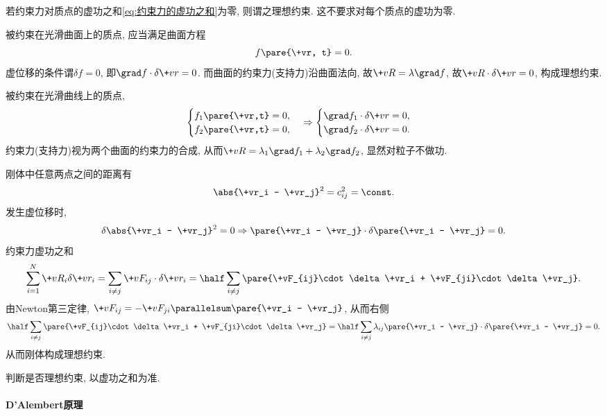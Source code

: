 \documentclass[../LectureNotes.tex]{subfiles}
\begin{document}
若约束力对质点的虚功之和\eqref{eq:约束力的虚功之和}为零, 则谓之理想约束. 这不要求对每个质点的虚功为零.
\begin{sample}
    \begin{ex}
        被约束在光滑曲面上的质点, 应当满足曲面方程
        \[ f\pare{\+vr, t} = 0. \]
        虚位移的条件谓$\delta f = 0$, 即$\grad f \cdot\delta\+vr = 0$. 而曲面的约束力(支持力)沿曲面法向, 故$\+vR = \lambda\grad f$, 故$\+vR\cdot\delta\+vr = 0$, 构成理想约束.
    \end{ex}
    \begin{ex}
        被约束在光滑曲线上的质点,
        \[ \begin{cases}
            f_1\pare{\+vr,t} = 0,\\
            f_2\pare{\+vr,t} = 0,
        \end{cases}\Rightarrow \begin{cases}
            \grad f_1 \cdot \delta \+vr = 0,\\
            \grad f_2 \cdot \delta \+vr = 0.
        \end{cases} \]
        约束力(支持力)视为两个曲面的约束力的合成, 从而$\+vR = \lambda_1 \grad f_1 + \lambda_2 \grad f_2$, 显然对粒子不做功.
    \end{ex}
    \begin{ex}
        刚体中任意两点之间的距离有
        \[ \abs{\+vr_i - \+vr_j}^2 = c_{ij}^2 = \const. \]
        发生虚位移时,
        \[ \delta\abs{\+vr_i - \+vr_j}^2 = 0 \Rightarrow \pare{\+vr_i - \+vr_j} \cdot\delta\pare{\+vr_i - \+vr_j} = 0. \]
        约束力虚功之和
        \[ \sum_{i=1}^N \+vR_i\delta\+vr_i = \sum_{i\neq j} \+vF_{ij}\cdot\delta\+vr_i = \half \sum_{i\neq j} \pare{\+vF_{ij}\cdot\delta\+vr_i + \+vF_{ji}\cdot\delta\+vr_j}. \]
        由Newton第三定律, $\+vF_{ij} = -\+vF_{ji} \parallelsum \pare{\+vr_i - \+vr_j}$, 从而右侧
        \[ \half \sum_{i\neq j} \pare{\+vF_{ij}\cdot\delta\+vr_i + \+vF_{ji}\cdot\delta\+vr_j} = \half \sum_{i\neq j} \lambda_{ij}\pare{\+vr_i - \+vr_j}\cdot\delta\pare{\+vr_i - \+vr_j} = 0. \]
        从而刚体构成理想约束.
    \end{ex}
\end{sample}
\begin{pitfall}
    判断是否理想约束, 以虚功之{\color{red}和}为准.
\end{pitfall}


\paragraph{D'Alembert原理} %
\label{par:d_alembert原理}
\end{document}
